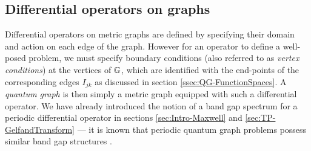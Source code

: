\subsection{Differential operators on graphs} \label{ssec:DiffOpsOnGraphs}
Differential operators on metric graphs are defined by specifying their domain and action on each edge of the graph.
However for an operator to define a well-posed problem, we must specify boundary conditions (also referred to as \emph{vertex conditions}) at the vertices of $\mathbb{G}$, which are identified with the end-points of the corresponding edges $I_{jk}$ as discussed in section \ref{ssec:QG-FunctionSpaces}.
A \emph{quantum graph} is then simply a metric graph equipped with such a differential operator.
We have already introduced the notion of a band gap spectrum for a periodic differential operator in sections \ref{sec:Intro-Maxwell} and \ref{sec:TP-GelfandTransform} --- it is known that periodic quantum graph problems possess similar band gap structures \cite[Chapter 4.3]{berkolaiko2013introduction}.

